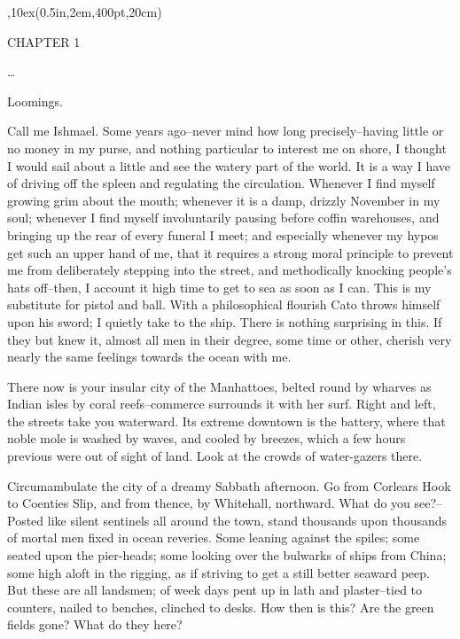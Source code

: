\fontfam[LMfonts]

\grid 1cm,10ex(0.5in,2em,400pt,20cm)

CHAPTER 1

\dots

Loomings.

Call me Ishmael. Some years ago--never mind how long
precisely--having little or no money in my purse, and nothing
particular to interest me on shore, I thought I would sail about a
little and see the watery part of the world. It is a way I have of
driving off the spleen and regulating the circulation. Whenever I
find myself growing grim about the mouth; whenever it is a damp,
drizzly November in my soul; whenever I find myself involuntarily
pausing before coffin warehouses, and bringing up the rear of every
funeral I meet; and especially whenever my hypos get such an upper
hand of me, that it requires a strong moral principle to prevent me
from deliberately stepping into the street, and methodically knocking
people's hats off--then, I account it high time to get to sea as soon
as I can. This is my substitute for pistol and ball. With a
philosophical flourish Cato throws himself upon his sword; I quietly
take to the ship. There is nothing surprising in this. If they but
knew it, almost all men in their degree, some time or other, cherish
very nearly the same feelings towards the ocean with me.

There now is your insular city of the Manhattoes, belted round by
wharves as Indian isles by coral reefs--commerce surrounds it with
her surf. Right and left, the streets take you waterward. Its
extreme downtown is the battery, where that noble mole is washed by
waves, and cooled by breezes, which a few hours previous were out of
sight of land. Look at the crowds of water-gazers there.

Circumambulate the city of a dreamy Sabbath afternoon. Go from
Corlears Hook to Coenties Slip, and from thence, by Whitehall,
northward. What do you see?--Posted like silent sentinels all around
the town, stand thousands upon thousands of mortal men fixed in ocean
reveries. Some leaning against the spiles; some seated upon the
pier-heads; some looking over the bulwarks of ships from China; some
high aloft in the rigging, as if striving to get a still better
seaward peep. But these are all landsmen; of week days pent up in
lath and plaster--tied to counters, nailed to benches, clinched to
desks. How then is this? Are the green fields gone? What do they
here?


